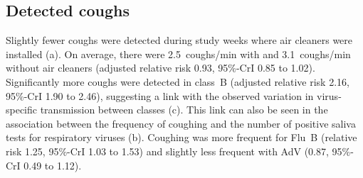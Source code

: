 \documentclass[fleqn,11pt]{wlscirep}
\begin{document}
\subsection{Detected coughs}

Slightly fewer coughs were detected during study weeks where air cleaners were installed (a). On average, there were 2.5~coughs/min with and 3.1~coughs/min without air cleaners (adjusted relative risk 0.93, 95\%-CrI 0.85 to 1.02). Significantly more coughs were detected in class~B (adjusted relative risk 2.16, 95\%-CrI 1.90 to 2.46), suggesting a link with the observed variation in virus-specific transmission between classes (c). This link can also be seen in the association between the frequency of coughing and the number of positive saliva tests for respiratory viruses (b). Coughing was more frequent for Flu~B (relative risk 1.25, 95\%-CrI 1.03 to 1.53) and slightly less frequent with AdV (0.87, 95\%-CrI 0.49 to 1.12). 
\end{document}

